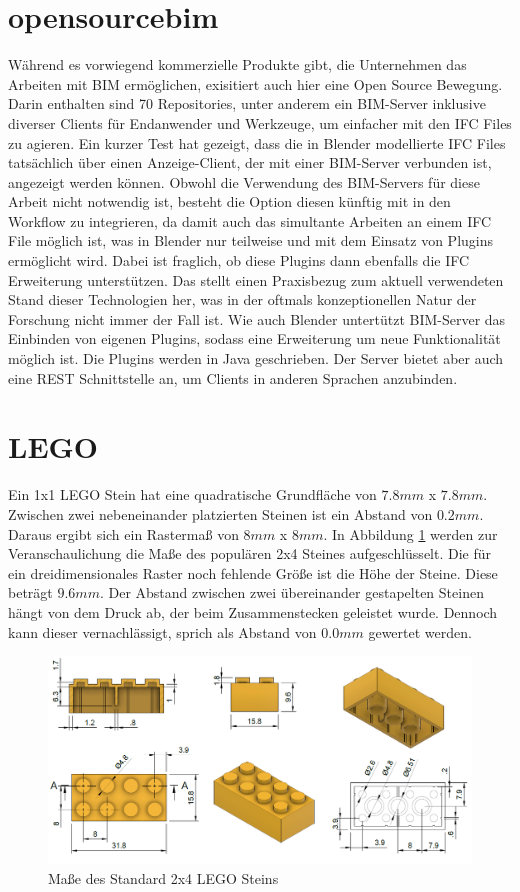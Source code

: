 \section{opensourcebim}
Während es vorwiegend kommerzielle Produkte gibt, die Unternehmen das Arbeiten mit BIM ermöglichen, exisitiert auch hier eine Open Source Bewegung.
Darin enthalten sind 70 Repositories, unter anderem ein BIM-Server inklusive diverser Clients für Endanwender und Werkzeuge, um einfacher mit den IFC Files zu agieren\cite{Theopens96:online}.
Ein kurzer Test hat gezeigt, dass die in Blender modellierte IFC Files tatsächlich über einen \glqq{}Anzeige-Client\grqq{}, der mit einer BIM-Server verbunden ist, angezeigt werden können.
Obwohl die Verwendung des BIM-Servers für diese Arbeit nicht notwendig ist, besteht die Option diesen künftig mit in den Workflow zu integrieren, da damit auch das simultante Arbeiten an einem IFC File möglich ist, was in Blender nur teilweise und mit dem Einsatz von Plugins ermöglicht wird.
Dabei ist fraglich, ob diese Plugins dann ebenfalls die IFC Erweiterung unterstützen.
Das stellt einen Praxisbezug zum aktuell verwendeten Stand dieser Technologien her, was in der oftmals konzeptionellen Natur der Forschung nicht immer der Fall ist.
Wie auch Blender untertützt BIM-Server das Einbinden von eigenen Plugins, sodass eine Erweiterung um neue Funktionalität möglich ist.
Die Plugins werden in Java geschrieben.
Der Server bietet aber auch eine REST Schnittstelle an, um Clients in anderen Sprachen anzubinden.

\section{LEGO}
\label{basics:lego}
Ein 1x1 LEGO Stein hat eine  quadratische Grundfläche von \(7.8mm\) x \(7.8mm\).
Zwischen zwei nebeneinander platzierten Steinen ist ein Abstand von  \(0.2mm\).
Daraus ergibt sich ein Rastermaß von \(8mm\) x  \(8mm\).
In Abbildung \ref{fig:Lego 2x4 Brick} werden zur Veranschaulichung die Maße des populären 2x4 Steines aufgeschlüsselt.
Die für ein dreidimensionales Raster noch fehlende Größe ist die Höhe der Steine.
Diese beträgt \(9.6mm\).
Der Abstand zwischen zwei übereinander gestapelten Steinen hängt von dem Druck ab, der beim Zusammenstecken geleistet wurde.
Dennoch kann dieser vernachlässigt, sprich als Abstand von \(0.0mm\) gewertet werden.

\begin{figure}[ht]
    \centering
    \includegraphics[width=0.8\columnwidth]{fig/LEGO 2x4 Brick horizontal.png}
    \caption{Maße des Standard 2x4 LEGO Steins \cite{LEGOBric2:online}}
    \label{fig:Lego 2x4 Brick}
\end{figure}

